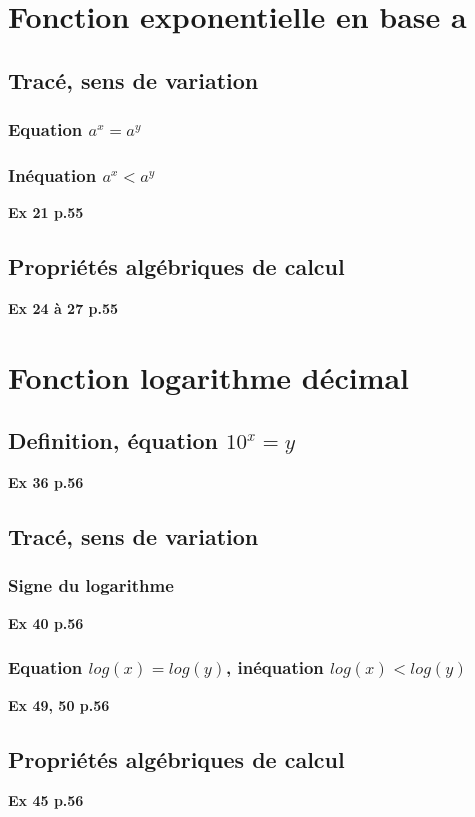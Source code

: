 \documentclass[10pt,a4paper,openany,twoside, eleve]{book}
\begin{document}
\entetegal
\makeatletter
{} %
\makeatother

\setcounter{sectionexo}{1}

\section{Fonction exponentielle en base a}
\subsection{Tracé, sens de variation}
\subsubsection*{Equation $a^x=a^y$}
\subsubsection*{Inéquation $a^x<a^y$}
\textbf{Ex 21 p.55}

\subsection{Propriétés algébriques de calcul}
\textbf{Ex 24 à 27 p.55}



\section{Fonction logarithme décimal}
\subsection{Definition, équation $10^x=y$}
\textbf{Ex 36 p.56}

\subsection{Tracé, sens de variation}
\subsubsection*{Signe du logarithme}
\textbf{Ex 40 p.56}
\subsubsection*{Equation $log(x)=log(y)$, inéquation $log(x)<log(y)$}
\textbf{Ex 49, 50 p.56}

\subsection{Propriétés algébriques de calcul}
\textbf{Ex 45 p.56}
\end{document}
